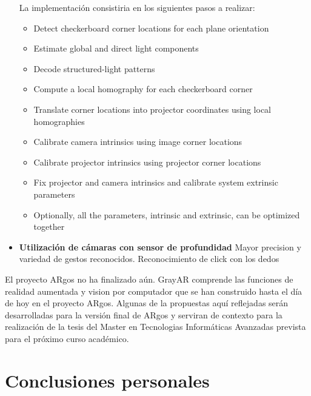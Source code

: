 \begin{itemize}
La implementación consistiria en los siguientes pasos a realizar:
\begin{itemize}
\item Detect checkerboard corner locations for each plane orientation
\item Estimate global and direct light components
\item Decode structured-light patterns
\item Compute a local homography for each checkerboard corner
\item Translate corner locations into projector coordinates using local homographies
\item Calibrate camera intrinsics using image corner locations
\item Calibrate projector intrinsics using projector corner locations
\item Fix projector and camera intrinsics and calibrate system extrinsic parameters
\item Optionally, all the parameters, intrinsic and extrinsic, can be optimized together
\end{itemize}
 
\item \textbf{Utilización de cámaras con sensor de profundidad} Mayor precision y variedad de gestos reconocidos. Reconocimiento de click con los dedos
\end{itemize}

El proyecto ARgos no ha finalizado aún. GrayAR comprende las funciones de realidad aumentada y vision por computador que se han construido hasta el día de hoy en el proyecto ARgos. Algunas de la propuestas aquí reflejadas serán desarrolladas para la versión final de ARgos y serviran de contexto para la realización de la tesis del Master en Tecnologias Informáticas Avanzadas prevista para el próximo curso académico.

\section{Conclusiones personales}
